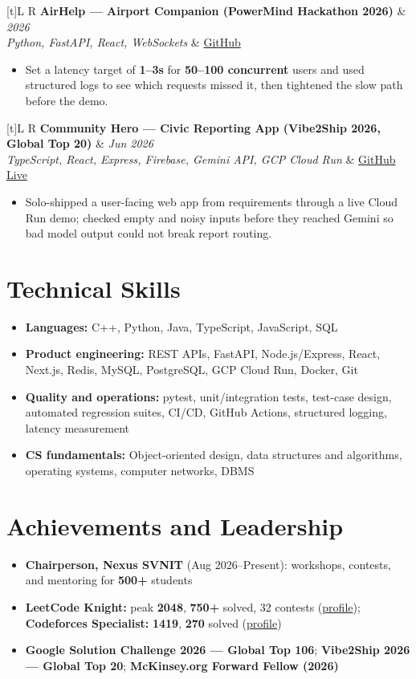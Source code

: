 \documentclass[a4paper,10pt]{article}
\newcommand{\resumeProject}[4]{%
  \vspace{0.4mm}
  \noindent
  \begin{tabularx}{\textwidth}[t]{L R}
    \textbf{#1} & \textit{#3} \\
    \textit{#2} & #4 \\
  \end{tabularx}
  \vspace{-0.4mm}%
}
\begin{document}
\resumeProject
  {AirHelp --- Airport Companion (PowerMind Hackathon 2026)}
  {Python, FastAPI, React, WebSockets}
  {2026}
  {\href{https://github.com/Ojas-Srivastava05/AirHelp-AI-Airport-Assistant}{GitHub}}
\begin{itemize}
  \item Set a latency target of \textbf{1--3s} for \textbf{50--100 concurrent} users and used structured logs to see which requests missed it, then tightened the slow path before the demo.
\end{itemize}

\resumeProject
  {Community Hero --- Civic Reporting App (Vibe2Ship 2026, Global Top 20)}
  {TypeScript, React, Express, Firebase, Gemini API, GCP Cloud Run}
  {Jun 2026}
  {\href{https://github.com/Ojas-Srivastava05/community-hero}{GitHub} \textbar{} \href{https://community-hero-987477089222.asia-south1.run.app}{Live}}
\begin{itemize}
  \item Solo-shipped a user-facing web app from requirements through a live Cloud Run demo; checked empty and noisy inputs before they reached Gemini so bad model output could not break report routing.
\end{itemize}

\section{Technical Skills}
\small
\begin{itemize}[label={}]
  \item \textbf{Languages:} C++, Python, Java, TypeScript, JavaScript, SQL
  \item \textbf{Product engineering:} REST APIs, FastAPI, Node.js/Express, React, Next.js, Redis, MySQL, PostgreSQL, GCP Cloud Run, Docker, Git
  \item \textbf{Quality and operations:} pytest, unit/integration tests, test-case design, automated regression suites, CI/CD, GitHub Actions, structured logging, latency measurement
  \item \textbf{CS fundamentals:} Object-oriented design, data structures and algorithms, operating systems, computer networks, DBMS
\end{itemize}

\section{Achievements and Leadership}
\small
\begin{itemize}
  \item \textbf{Chairperson, Nexus SVNIT} (Aug 2026--Present): workshops, contests, and mentoring for \textbf{500+} students
  \item \textbf{LeetCode Knight:} peak \textbf{2048}, \textbf{750+} solved, 32 contests (\href{https://leetcode.com/Oju_Srivastava}{profile}); \textbf{Codeforces Specialist:} \textbf{1419}, \textbf{270} solved (\href{https://codeforces.com/profile/Oju}{profile})
  \item \textbf{Google Solution Challenge 2026 --- Global Top 106}; \textbf{Vibe2Ship 2026 --- Global Top 20}; \textbf{McKinsey.org Forward Fellow (2026)}
\end{itemize}
\end{document}
